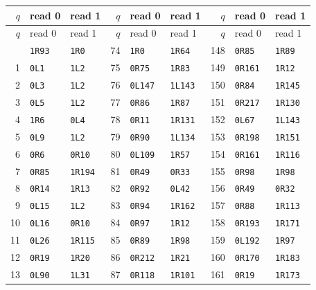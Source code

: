\small
\begin{longtable}{@{}rll@{\hspace{1.2em}}rll@{\hspace{1.2em}}rll@{}}
\toprule
$q$ & read 0 & read 1 & $q$ & read 0 & read 1 & $q$ & read 0 & read 1\\
\midrule\endfirsthead
\toprule
$q$ & read 0 & read 1 & $q$ & read 0 & read 1 & $q$ & read 0 & read 1\\
\midrule\endhead
\bottomrule\endfoot
0 & \texttt{1R93} & \texttt{1R0} & 74 & \texttt{1R0} & \texttt{1R64} & 148 & \texttt{0R85} & \texttt{1R89}\\
1 & \texttt{0L1} & \texttt{1L2} & 75 & \texttt{0R75} & \texttt{1R83} & 149 & \texttt{0R161} & \texttt{1R12}\\
2 & \texttt{0L3} & \texttt{1L2} & 76 & \texttt{0L147} & \texttt{1L143} & 150 & \texttt{0R84} & \texttt{1R145}\\
3 & \texttt{0L5} & \texttt{1L2} & 77 & \texttt{0R86} & \texttt{1R87} & 151 & \texttt{0R217} & \texttt{1R130}\\
4 & \texttt{1R6} & \texttt{0L4} & 78 & \texttt{0R11} & \texttt{1R131} & 152 & \texttt{0L67} & \texttt{1L143}\\
5 & \texttt{0L9} & \texttt{1L2} & 79 & \texttt{0R90} & \texttt{1L134} & 153 & \texttt{0R198} & \texttt{1R151}\\
6 & \texttt{0R6} & \texttt{0R10} & 80 & \texttt{0L109} & \texttt{1R57} & 154 & \texttt{0R161} & \texttt{1R116}\\
7 & \texttt{0R85} & \texttt{1R194} & 81 & \texttt{0R49} & \texttt{0R33} & 155 & \texttt{0R98} & \texttt{1R98}\\
8 & \texttt{0R14} & \texttt{1R13} & 82 & \texttt{0R92} & \texttt{0L42} & 156 & \texttt{0R49} & \texttt{0R32}\\
9 & \texttt{0L15} & \texttt{1L2} & 83 & \texttt{0R94} & \texttt{1R162} & 157 & \texttt{0R88} & \texttt{1R113}\\
10 & \texttt{0L16} & \texttt{0R10} & 84 & \texttt{0R97} & \texttt{1R12} & 158 & \texttt{0R193} & \texttt{1R171}\\
11 & \texttt{0L26} & \texttt{1R115} & 85 & \texttt{0R89} & \texttt{1R98} & 159 & \texttt{0L192} & \texttt{1R97}\\
12 & \texttt{0R19} & \texttt{1R20} & 86 & \texttt{0R212} & \texttt{1R21} & 160 & \texttt{0R170} & \texttt{1R183}\\
13 & \texttt{0L90} & \texttt{1L31} & 87 & \texttt{0R118} & \texttt{1R101} & 161 & \texttt{0R19} & \texttt{1R173}\\

\end{longtable}
